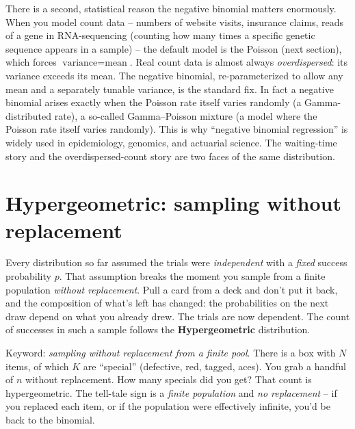 \begin{applicationbox}
There is a second, statistical reason the negative binomial matters enormously.
When you model count data -- numbers of website visits, insurance claims, reads of
a gene in RNA-sequencing (counting how many times a specific genetic sequence appears in a sample) -- the default model is the Poisson (next section), which
forces $\text{variance} = \text{mean}$. Real count data is almost always
\emph{overdispersed}: its variance exceeds its mean. The negative binomial,
re-parameterized to allow any mean and a separately tunable variance, is the
standard fix. In fact a negative binomial arises exactly when the Poisson rate
itself varies randomly (a Gamma-distributed rate), a so-called Gamma--Poisson
mixture (a model where the Poisson rate itself varies randomly). This is why ``negative binomial regression'' is widely used in
epidemiology, genomics, and actuarial science.
The waiting-time story and the overdispersed-count story are two faces of the same
distribution.
\end{applicationbox}

\section{Hypergeometric: sampling without replacement}
\label{ch07:hypergeometric}

Every distribution so far assumed the trials were \emph{independent} with a
\emph{fixed} success probability $p$. That assumption breaks the moment
you sample from a finite population \emph{without replacement}. Pull a card from a
deck and don't put it back, and the composition of what's left has changed: the
probabilities on the next draw depend on what you already drew. The trials are now
dependent. The count of successes in such a sample follows the
\textbf{Hypergeometric} distribution.

\begin{intuitionbox}
Keyword: \emph{sampling without replacement from a finite pool}. There is a box
with $N$ items, of which $K$ are ``special'' (defective, red, tagged, aces). You
grab a handful of $n$ without replacement. How many specials did you get? That
count is hypergeometric. The tell-tale sign is a \emph{finite population} and
\emph{no replacement} -- if you replaced each item, or if the population were
effectively infinite, you'd be back to the binomial.
\end{intuitionbox}


